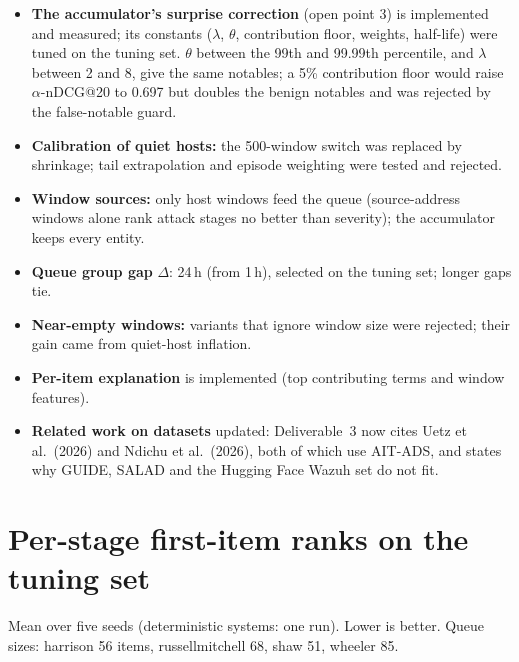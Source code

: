 \documentclass[10.5pt,a4paper]{article}
\begin{document}
\begin{itemize}
\item \textbf{The accumulator's surprise correction} (open point 3) is implemented and measured; its constants ($\lambda$, $\theta$, contribution floor, weights, half-life) were tuned on the tuning set. $\theta$ between the 99th and 99.99th percentile, and $\lambda$ between 2 and 8, give the same notables; a 5\% contribution floor would raise $\alpha$-nDCG@20 to 0.697 but doubles the benign notables and was rejected by the false-notable guard.
\item \textbf{Calibration of quiet hosts:} the 500-window switch was replaced by shrinkage; tail extrapolation and episode weighting were tested and rejected.
\item \textbf{Window sources:} only host windows feed the queue (source-address windows alone rank attack stages no better than severity); the accumulator keeps every entity.
\item \textbf{Queue group gap} $\Delta$: 24\,h (from 1\,h), selected on the tuning set; longer gaps tie.
\item \textbf{Near-empty windows:} variants that ignore window size were rejected; their gain came from quiet-host inflation.
\item \textbf{Per-item explanation} is implemented (top contributing terms and window features).
\item \textbf{Related work on datasets} updated: Deliverable~3 now cites Uetz et al.\ (2026) and Ndichu et al.\ (2026), both of which use AIT-ADS, and states why GUIDE, SALAD and the Hugging Face Wazuh set do not fit.
\end{itemize}

\appendix
\section{Per-stage first-item ranks on the tuning set}

Mean over five seeds (deterministic systems: one run). Lower is better. Queue sizes: harrison 56 items, russellmitchell 68, shaw 51, wheeler 85.
\end{document}
